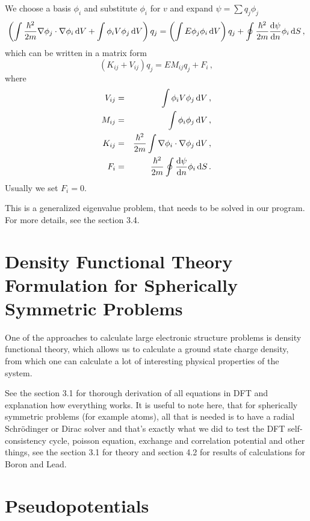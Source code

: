 We choose a basis $\phi_i$ and substitute $\phi_i$ for $v$ and expand $\psi=\sum q_j\phi_j$
\begin{equation}
  \left(\int{\hbar^2\over2m}\nabla\phi_j\cdot\nabla\phi_i\,{\rm d} V+ \int\phi_iV\phi_j\,{\rm d} V\right)q_j = \left(\int E\phi_j\phi_i\,{\rm d} V\right)q_j +\oint{\hbar^2\over2m}{{\rm d}\psi\over{\rm d}n}\phi_i\,{\rm d} S\,,  \label{fem}
\end{equation}
which can be written in a matrix form 
\begin{equation*}
  \left(K_{ij}+V_{ij}\right)q_j=EM_{ij}q_j+F_i\,,
\end{equation*}
where 
\begin{eqnarray*}
V_{ij}&=&\int\phi_iV\phi_j\,{\rm d} V\,, \\
M_{ij}&=&\int\phi_i\phi_j\,{\rm d} V\,, \\
K_{ij}&=&{\hbar^2\over2m}\int\nabla\phi_i\cdot\nabla\phi_j\,{\rm d} V\,, \\
F_i&=&{\hbar^2\over2m}\oint{{\rm d}\psi\over{\rm d}n}\phi_i\,{\rm d} S\,. \\
\end{eqnarray*}
 Usually we set $F_i=0$.

This is a generalized eigenvalue problem, that needs to be solved in our
program. For more details, see the section 3.4.

\section{Density Functional Theory Formulation for Spherically Symmetric
Problems}

One of the approaches to calculate large electronic structure problems is
density functional theory, which allows us to calculate a ground state charge
density, from which one can calculate a lot of interesting physical properties
of the system.

See the section 3.1 for thorough derivation of all equations in DFT and
explanation how everything works. It is useful to note here, that for
spherically symmetric problems (for example atoms), all that is needed is
to have a radial Schr\"odinger or Dirac solver and that's exactly what we did
to test the DFT self-consistency cycle, poisson equation, exchange and
correlation potential and other things, see the section 3.1 for theory and
section 4.2 for results of calculations for Boron and Lead.

\section{Pseudopotentials}

